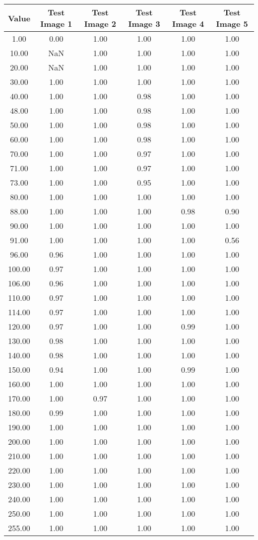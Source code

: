 \begin{tabular}{|c|c|c|c|c|c|}
\hline
\textbf{Value}&\textbf{Test Image 1}&\textbf{Test Image 2}&\textbf{Test Image 3}&\textbf{Test Image 4}&\textbf{Test Image 5}\\\hline
1.00&0.00&1.00&1.00&1.00&1.00\\\hline
10.00&NaN&1.00&1.00&1.00&1.00\\\hline
20.00&NaN&1.00&1.00&1.00&1.00\\\hline
30.00&1.00&1.00&1.00&1.00&1.00\\\hline
40.00&1.00&1.00&0.98&1.00&1.00\\\hline
48.00&1.00&1.00&0.98&1.00&1.00\\\hline
50.00&1.00&1.00&0.98&1.00&1.00\\\hline
60.00&1.00&1.00&0.98&1.00&1.00\\\hline
70.00&1.00&1.00&0.97&1.00&1.00\\\hline
71.00&1.00&1.00&0.97&1.00&1.00\\\hline
73.00&1.00&1.00&0.95&1.00&1.00\\\hline
80.00&1.00&1.00&1.00&1.00&1.00\\\hline
88.00&1.00&1.00&1.00&0.98&0.90\\\hline
90.00&1.00&1.00&1.00&1.00&1.00\\\hline
91.00&1.00&1.00&1.00&1.00&0.56\\\hline
96.00&0.96&1.00&1.00&1.00&1.00\\\hline
100.00&0.97&1.00&1.00&1.00&1.00\\\hline
106.00&0.96&1.00&1.00&1.00&1.00\\\hline
110.00&0.97&1.00&1.00&1.00&1.00\\\hline
114.00&0.97&1.00&1.00&1.00&1.00\\\hline
120.00&0.97&1.00&1.00&0.99&1.00\\\hline
130.00&0.98&1.00&1.00&1.00&1.00\\\hline
140.00&0.98&1.00&1.00&1.00&1.00\\\hline
150.00&0.94&1.00&1.00&0.99&1.00\\\hline
160.00&1.00&1.00&1.00&1.00&1.00\\\hline
170.00&1.00&0.97&1.00&1.00&1.00\\\hline
180.00&0.99&1.00&1.00&1.00&1.00\\\hline
190.00&1.00&1.00&1.00&1.00&1.00\\\hline
200.00&1.00&1.00&1.00&1.00&1.00\\\hline
210.00&1.00&1.00&1.00&1.00&1.00\\\hline
220.00&1.00&1.00&1.00&1.00&1.00\\\hline
230.00&1.00&1.00&1.00&1.00&1.00\\\hline
240.00&1.00&1.00&1.00&1.00&1.00\\\hline
250.00&1.00&1.00&1.00&1.00&1.00\\\hline
255.00&1.00&1.00&1.00&1.00&1.00\\\hline
\end{tabular}
